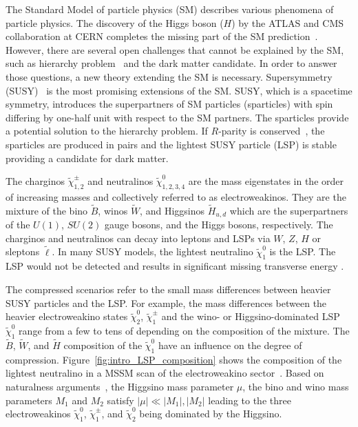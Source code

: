 The Standard Model of particle physics (SM) describes various phenomena of particle physics.
The discovery of the Higgs boson ($H$) by the ATLAS and CMS collaboration at CERN completes the missing part of the SM prediction~\cite{Aad:2012tfa, Chatrchyan:2012xdj}.
However, there are several open challenges that cannot be explained by the SM, such as hierarchy problem~\cite{Weinberg:1975gm, Gildener:1976ai, Susskind:1978ms} and the dark matter candidate.
In order to answer those questions, a new theory extending the SM is necessary.
Supersymmetry (SUSY)~\cite{Wess:1973kz, Wess:1974tw, Golfand:1971iw, Martin:1997ns} is the most promising extensions of the SM.
SUSY, which is a spacetime symmetry, introduces the superpartners of SM particles (sparticles) with spin differing by one-half unit with respect to the SM partners.
The sparticles provide a potential solution to the hierarchy problem.
If $R$-parity is conserved~\cite{Fayet:1976et, Fayet:1977yc, Farrar:1978xj}, the sparticles are produced in pairs and the lightest SUSY particle (LSP) is stable providing a candidate for dark matter.

The charginos $\widetilde{\chi}^{\pm}_{1,2}$ and neutralinos $\widetilde{\chi}^{0}_{1,2,3,4}$ are the mass eigenstates in the order of increasing masses and collectively referred to as electroweakinos.
They are the mixture of the bino $\widetilde{B}$, winos $\widetilde{W}$, and Higgsinos $\widetilde{H}_{u,d}$ which are the superpartners of the $U(1)$, $SU(2)$ gauge bosons, and the Higgs bosons, respectively.
The charginos and neutralinos can decay into leptons and LSPs via $W$, $Z$, $H$ or sleptons $\widetilde{\ell}$.
In many SUSY models, the lightest neutralino $\widetilde{\chi}^{0}_{1}$ is the LSP.
The LSP would not be detected and results in significant missing transverse energy \MET.

The compressed scenarios refer to the small mass differences between heavier SUSY particles and the LSP.
For example, the mass differences between the heavier electroweakino states $\widetilde{\chi}^{0}_{2}$, $\widetilde{\chi}^{\pm}_{1}$ and the wino- or Higgsino-dominated LSP $\widetilde{\chi}^{0}_{1}$ range from a few {\MeV} to tens of {\GeV} depending on the composition of the mixture.
The $\widetilde{B}$, $\widetilde{W}$, and $\widetilde{H}$ composition of the $\widetilde{\chi}^{0}_{1}$ have an influence on the degree of compression.
Figure~\ref{fig:intro_LSP_composition} shows the composition of the lightest neutralino in a MSSM scan of the electroweakino sector~\cite{Aaboud:2016wna}.
Based on naturalness arguments~\cite{Barbieri:1987fn, deCarlos:1993rbr}, the Higgsino mass parameter $\mu$, the bino and wino mass parameters $M_{1}$ and $M_{2}$ satisfy $|\mu| \ll |M_{1}|, |M_{2}|$ leading to the three electroweakinos $\widetilde{\chi}^{0}_{1}$, $\widetilde{\chi}^{\pm}_{1}$, and $\widetilde{\chi}^{0}_{2}$ being dominated by the Higgsino.

